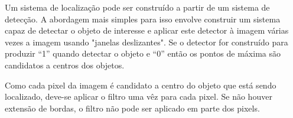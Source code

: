 Um sistema de localização pode ser construído a partir de um sistema de
detecção. A abordagem mais simples para isso envolve construir um sistema capaz
de detectar o objeto de interesse e aplicar este
detector à imagem várias vezes a imagem usando "janelas deslizantes".
Se o detector for construído para produzir “1” quando detectar o objeto e
“0” então os pontos de máxima são candidatos a centros dos objetos.

Como cada pixel da imagem é candidato a centro do objeto que está sendo
localizado, deve-se aplicar o filtro uma vêz para cada pixel. Se não houver
extensão de bordas, o filtro não pode ser aplicado em parte dos pixels.
